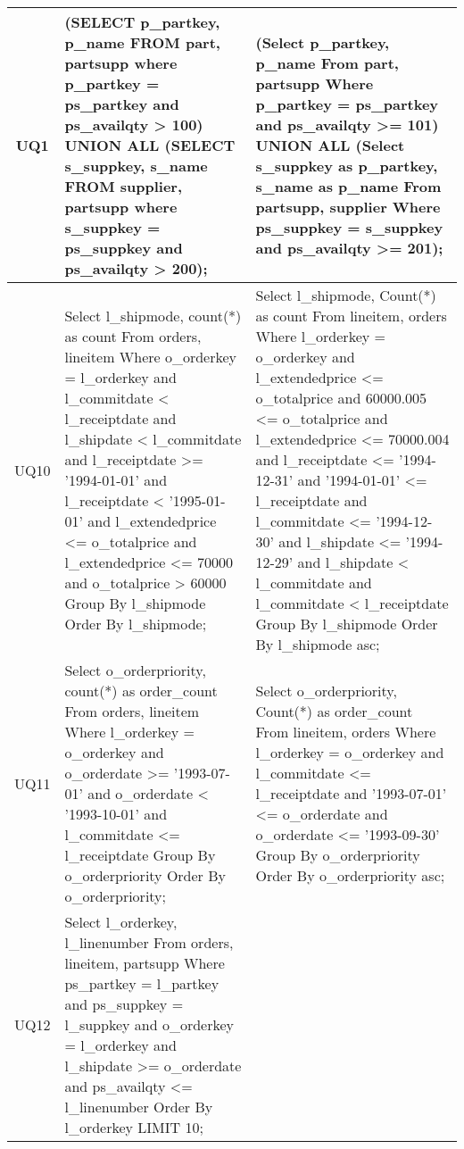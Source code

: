 \onecolumn
\begin{center}
\tablehead{\hline}
\tabletail{\hline}
\tablelasttail{\hline}
\begin{supertabular}{|c|p{7cm}|p{7cm}|}\hline\footnotesize{UQ1} &
\footnotesize{(SELECT p\_partkey, p\_name FROM part, partsupp where p\_partkey = ps\_partkey and ps\_availqty > 100) UNION ALL (SELECT s\_suppkey, s\_name FROM supplier, partsupp where s\_suppkey = ps\_suppkey and ps\_availqty > 200);} &
\footnotesize{(Select p\_partkey, p\_name  From part, partsupp   Where p\_partkey = ps\_partkey  and ps\_availqty  >= 101)  UNION ALL  (Select s\_suppkey as p\_partkey, s\_name as p\_name  From partsupp, supplier   Where ps\_suppkey = s\_suppkey  and ps\_availqty  >= 201);} \\\hline\footnotesize{UQ10} &
\footnotesize{Select l\_shipmode, count(*) as count From orders, lineitem Where o\_orderkey = l\_orderkey and l\_commitdate < l\_receiptdate and l\_shipdate < l\_commitdate and l\_receiptdate >= '1994-01-01' and l\_receiptdate < '1995-01-01' and l\_extendedprice <= o\_totalprice and l\_extendedprice <= 70000 and o\_totalprice > 60000 Group By l\_shipmode Order By l\_shipmode;} &
\footnotesize{Select l\_shipmode, Count(*) as count  From lineitem, orders   Where l\_orderkey = o\_orderkey  and l\_extendedprice <= o\_totalprice  and 60000.005 <= o\_totalprice  and l\_extendedprice <= 70000.004  and l\_receiptdate <= '1994-12-31'  and '1994-01-01' <= l\_receiptdate  and l\_commitdate <= '1994-12-30'  and l\_shipdate <= '1994-12-29'  and l\_shipdate < l\_commitdate  and l\_commitdate < l\_receiptdate   Group By l\_shipmode   Order By l\_shipmode asc;} \\\hline\footnotesize{UQ11} &
\footnotesize{Select o\_orderpriority, count(*) as order\_count From orders, lineitem Where l\_orderkey = o\_orderkey and o\_orderdate >= '1993-07-01' and o\_orderdate < '1993-10-01' and l\_commitdate <= l\_receiptdate Group By o\_orderpriority Order By o\_orderpriority;} &
\footnotesize{Select o\_orderpriority, Count(*) as order\_count  From lineitem, orders   Where l\_orderkey = o\_orderkey  and l\_commitdate <= l\_receiptdate  and '1993-07-01' <= o\_orderdate  and o\_orderdate <= '1993-09-30'   Group By o\_orderpriority   Order By o\_orderpriority asc;} \\\hline\footnotesize{UQ12} &
\footnotesize{Select l\_orderkey, l\_linenumber From orders, lineitem, partsupp Where ps\_partkey = l\_partkey and ps\_suppkey = l\_suppkey and o\_orderkey = l\_orderkey and l\_shipdate >= o\_orderdate and ps\_availqty <= l\_linenumber Order By l\_orderkey LIMIT 10;} &

\end{supertabular}
\end{center}
